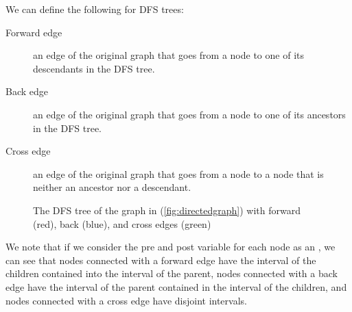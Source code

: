 \documentclass[12pt]{extarticle}
\begin{document}
We can define the following for DFS trees:

\begin{description}
    \item[Forward edge] an edge of the original graph that goes from a node to one of its descendants in the DFS tree.
    \item[Back edge] an edge of the original graph that goes from a node to one of its ancestors in the DFS tree.
    \item[Cross edge] an edge of the original graph that goes from a node to a node that is neither an ancestor nor a descendant.
\end{description}

\begin{figure}[H]
    \centering
    \caption{The DFS tree of the graph in (\ref{fig:directedgraph}) with forward (red), back (blue), and cross edges (green)} \label{fig:dfs-tree-fbg}
\end{figure}

We note that if we consider the pre and post variable for each node as an ,
we can see that nodes connected with a forward edge have the interval of the children contained into the interval of the parent,
nodes connected with a back edge have the interval of the parent contained in the interval of the children,
and nodes connected with a cross edge have disjoint intervals.
\end{document}
